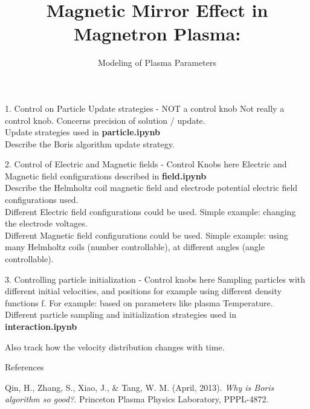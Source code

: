 \documentclass{beamer}
\title[]{Magnetic Mirror Effect in Magnetron Plasma:}
\subtitle{Modeling of Plasma Parameters}
\begin{document}
	
	\begin{frame}
		\titlepage	
	\end{frame}	
	
	\begin{frame}[t]{1. Control on Particle Update strategies - NOT a control knob }
		Not really a control knob. Concerns precision of solution / update. \\
		
		\noindent Update strategies used in \textbf{particle.ipynb}\\
		
		\noindent Describe the Boris algorithm update strategy.
	\end{frame}

	\begin{frame}[t]{2. Control of Electric and Magnetic fields - Control Knobs here}
		Electric and Magnetic field configurations described in \textbf{field.ipynb} \\
		
		\noindent Describe the Helmholtz coil magnetic field and electrode potential electric field configurations used. \\
		
		\noindent
		Different Electric field configurations could be used. Simple example: changing the electrode voltages. \\
		
		\noindent Different Magnetic field configurations could be used. Simple example: using many Helmholtz coils (number controllable), at different angles (angle controllable).
	\end{frame}

	\begin{frame}[t]{3. Controlling particle initialization - Control knobs here}
		Sampling particles with different initial velocities, and positions for example using different density functions f. For example: based on parameters like plasma Temperature. \\
		
		\noindent Different particle sampling and initialization strategies used in \textbf{interaction.ipynb}
		
		Also track how the velocity distribution changes with time.
	\end{frame}

	\begin{frame}[t]{References}
	\begin{thebibliography}{}
		\bibitem{Borisgood}
		Qin, H., Zhang, S., Xiao, J., $\&$ Tang, W. M. (April, 2013). \textit{Why is Boris algorithm so good?}. Princeton Plasma Physics Laboratory, PPPL-4872.
		
	\end{thebibliography}
	\end{frame}
\end{document}

